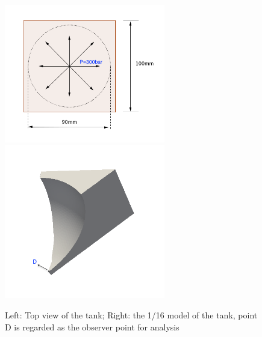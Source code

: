 \begin{figure}[htbp]
	\begin{center}	
		\includegraphics[width=7cm,clip]{threeDmodel1.png} 
	    \includegraphics[width=7cm,clip]{threeDmodel2.png} 			
		\caption{Left: Top view of the tank; Right: the 1/16 model of the tank, point D is regarded as the observer point for analysis} \label{fig: threeDmodel}
	\end{center}
\end{figure}

